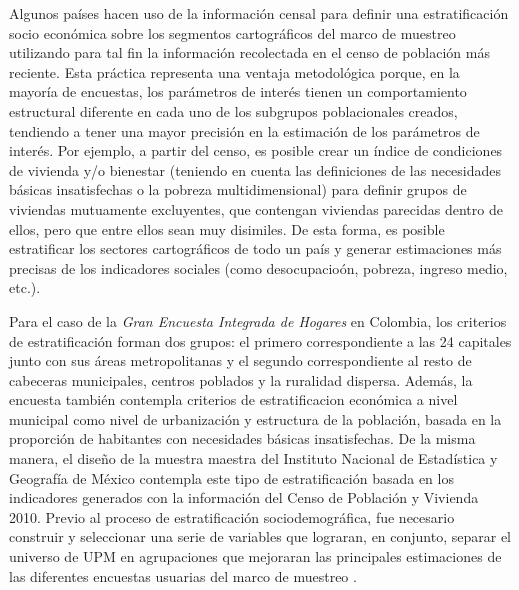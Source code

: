 \documentclass[
  12pt,
]{book}
\begin{document}
Algunos países hacen uso de la información censal para definir una estratificación socio económica sobre los segmentos cartográficos del marco de muestreo utilizando para tal fin la información recolectada en el censo de población más reciente. Esta práctica representa una ventaja metodológica porque, en la mayoría de encuestas, los parámetros de interés tienen un comportamiento estructural diferente en cada uno de los subgrupos poblacionales creados, tendiendo a tener una mayor precisión en la estimación de los parámetros de interés. Por ejemplo, a partir del censo, es posible crear un índice de condiciones de vivienda y/o bienestar (teniendo en cuenta las definiciones de las necesidades básicas insatisfechas o la pobreza multidimensional) para definir grupos de viviendas mutuamente excluyentes, que contengan viviendas parecidas dentro de ellos, pero que entre ellos sean muy disimiles. De esta forma, es posible estratificar los sectores cartográficos de todo un país y generar estimaciones más precisas de los indicadores sociales (como desocupacioón, pobreza, ingreso medio, etc.).

Para el caso de la \emph{Gran Encuesta Integrada de Hogares} en Colombia, los criterios de estratificación forman dos grupos: el primero correspondiente a las 24 capitales junto con sus áreas metropolitanas y el segundo correspondiente al resto de cabeceras municipales, centros poblados y la ruralidad dispersa. Además, la encuesta también contempla criterios de estratificacion económica a nivel municipal como nivel de urbanización y estructura de la población, basada en la proporción de habitantes con necesidades básicas insatisfechas. De la misma manera, el diseño de la muestra maestra del Instituto Nacional de Estadística y Geografía de México contempla este tipo de estratificación basada en los indicadores generados con la información del Censo de Población y Vivienda 2010. Previo al proceso de estratificación sociodemográfica, fue necesario construir y seleccionar una serie de variables que lograran, en conjunto, separar el universo de UPM en agrupaciones que mejoraran las principales estimaciones de las diferentes encuestas usuarias del marco de muestreo \citep{INEGI_MX_2012}.
\end{document}
